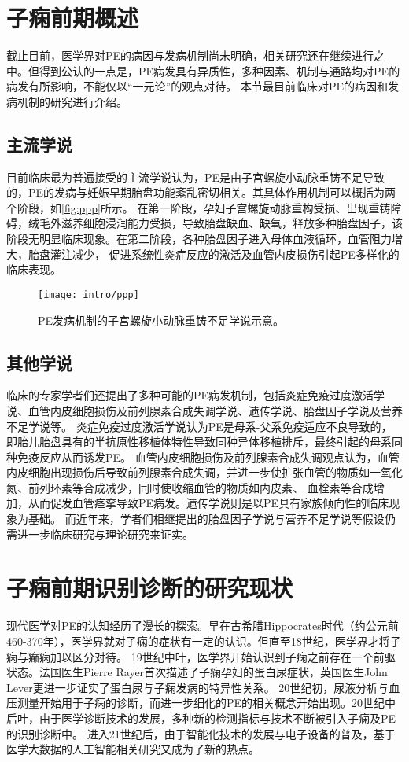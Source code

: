 \section{子痫前期概述}
截止目前，医学界对PE的病因与发病机制尚未明确，相关研究还在继续进行之中。但得到公认的一点是，PE病发具有异质性，多种因素、机制与通路均对PE的病发有所影响，不能仅以“一元论”的观点对待。
本节最目前临床对PE的病因和发病机制的研究进行介绍。

\subsection{主流学说}
目前临床最为普遍接受的主流学说认为，PE是由子宫螺旋小动脉重铸不足导致的，PE的发病与妊娠早期胎盘功能紊乱密切相关\cite{OAG9,Duvekot2010,2009ix}。其具体作用机制可以概括为两个阶段，如\autoref{fig:ppp}所示。
在第一阶段，孕妇子宫螺旋动脉重构受损、出现重铸障碍，绒毛外滋养细胞浸润能力受损，导致胎盘缺血、缺氧，释放多种胎盘因子，该阶段无明显临床现象。在第二阶段，各种胎盘因子进入母体血液循环，血管阻力增大，胎盘灌注减少，
促进系统性炎症反应的激活及血管内皮损伤引起PE多样化的临床表现。
\begin{figure}[htbp]
    \centering
    \texttt{[image: intro/ppp]}
    \caption[PE发病机制的子宫螺旋小动脉重铸不足学说示意]{\label{fig:ppp}PE发病机制的子宫螺旋小动脉重铸不足学说示意\cite{Duvekot2010,2009ix}。}
\end{figure}

\subsection{其他学说}
临床的专家学者们还提出了多种可能的PE病发机制，包括炎症免疫过度激活学说、血管内皮细胞损伤及前列腺素合成失调学说、遗传学说、胎盘因子学说及营养不足学说等。
炎症免疫过度激活学说认为PE是母系-父系免疫适应不良导致的，即胎儿胎盘具有的半抗原性移植体特性导致同种异体移植排斥，最终引起的母系同种免疫反应从而诱发PE\cite{Sibai2005,OAG9,Shi2006,Moffett2002}。
血管内皮细胞损伤及前列腺素合成失调观点认为，血管内皮细胞出现损伤后导致前列腺素合成失调，并进一步使扩张血管的物质如一氧化氮、前列环素等合成减少，同时使收缩血管的物质如内皮素、
血栓素等合成增加，从而促发血管痉挛导致PE病发\cite{OAG9,Sibai2005}。遗传学说则是以PE具有家族倾向性的临床现象为基础\cite{OAG9,Sibai2005,Ge2013}。
而近年来，学者们相继提出的胎盘因子学说\cite{Shi2006}与营养不足学说\cite{OAG9}等假设仍需进一步临床研究与理论研究来证实。
\raggedbottom

\section{子痫前期识别诊断的研究现状}
现代医学对PE的认知经历了漫长的探索\cite{BJOG2016}。早在古希腊Hippocrates时代（约公元前460-370年），医学界就对子痫的症状有一定的认识。但直至18世纪，医学界才将子痫与癫痫加以区分对待。
19世纪中叶，医学界开始认识到子痫之前存在一个前驱状态。法国医生Pierre Rayer首次描述了子痫孕妇的蛋白尿症状，英国医生John Lever更进一步证实了蛋白尿与子痫发病的特异性关系。
20世纪初，尿液分析与血压测量开始用于子痫的诊断，而进一步细化的PE的相关概念开始出现。20世纪中后叶，由于医学诊断技术的发展，多种新的检测指标与技术不断被引入子痫及PE的识别诊断中。
进入21世纪后，由于智能化技术的发展与电子设备的普及，基于医学大数据的人工智能相关研究又成为了新的热点。

